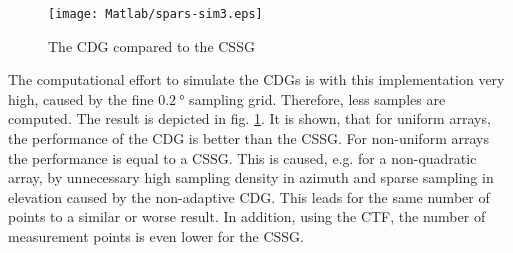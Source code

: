 \begin{figure}[h]
\centering
\texttt{[image: Matlab/spars-sim3.eps]}
\caption{The CDG compared to the CSSG}
\label{fig:cdg}
\end{figure}

The computational effort to simulate the \acp{CDG} is with this implementation very high, caused by the fine $\SI{0.2}{\degree}$ sampling grid.
Therefore, less samples are computed. The result is depicted in fig. \ref{fig:cdg}. It is shown, that for uniform arrays, the performance of the \ac{CDG} is better than the \ac{CSSG}. For non-uniform arrays the performance is equal to a \ac{CSSG}.
This is caused, e.g. for a non-quadratic array, by unnecessary high sampling density in azimuth and sparse sampling in elevation caused by the non-adaptive \ac{CDG}. This leads for the same number of points to a similar or worse result. In addition, using the \ac{CTF}, the number of measurement points is even lower for the \ac{CSSG}.




